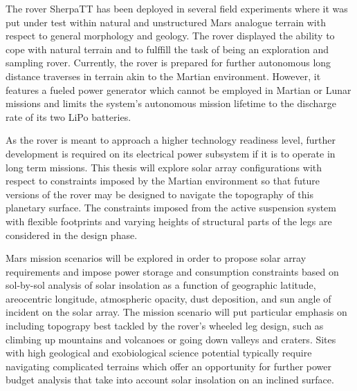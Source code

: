 The rover SherpaTT has been deployed in several field experiments where it was put under test within natural and unstructured Mars analogue terrain with respect to general morphology and geology. The rover displayed the ability to cope with natural terrain and to fulffill the task of being an exploration and sampling rover. Currently, the rover is prepared for further autonomous long distance traverses in terrain akin to the Martian environment. However, it features a fueled power generator which cannot be employed in Martian or Lunar missions and limits the system's autonomous mission lifetime to the discharge rate of its two LiPo batteries.

As the rover is meant to approach a higher technology readiness level, further development is required on its electrical power subsystem if it is to operate in long term missions. This thesis will explore solar array configurations with respect to constraints imposed by the Martian environment so that future versions of the rover may be designed to navigate the topography of this planetary surface. The constraints imposed from the active suspension system with flexible footprints and varying heights of structural parts of the legs are considered in the design phase.

Mars mission scenarios will be explored in order to propose solar array requirements and impose power storage and consumption constraints based on sol-by-sol analysis of solar insolation as a function of geographic latitude, areocentric longitude, atmospheric opacity, dust deposition, and sun angle of incident on the solar array. The mission scenario will put particular emphasis on including topograpy best tackled by the rover's wheeled leg design, such as climbing up mountains and volcanoes or going down valleys and craters. Sites with high geological and exobiological science potential typically require navigating complicated terrains which offer an opportunity for further power budget analysis that take into account solar insolation on an inclined surface.




